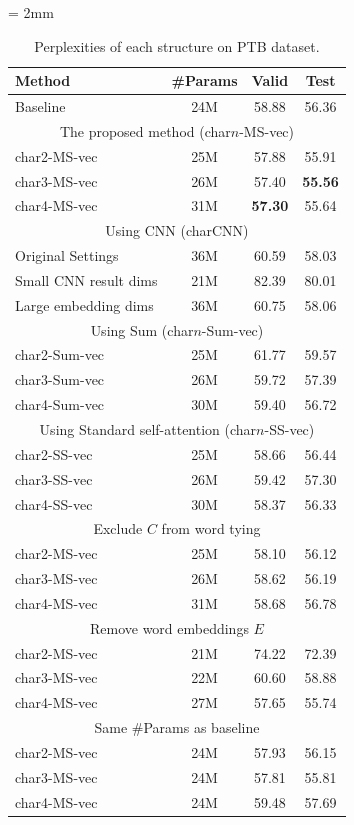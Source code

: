 \documentclass[letterpaper]{article} %
\begin{document}
\begin{table}[!t]
  \centering
  \small
  \tabcolsep = 2mm
  \begin{tabular}{ l | c | c  c  }
  \toprule
  Method & \#Params & Valid & Test \\
  \midrule
  Baseline  & 24M & 58.88 & 56.36 \\
  \midrule
  \multicolumn{4}{c}{The proposed method (char$n$-MS-vec)} \\
  \midrule
  char2-MS-vec & 25M & 57.88 & 55.91 \\
  char3-MS-vec & 26M & 57.40 & {\bf 55.56} \\
  char4-MS-vec & 31M & {\bf 57.30} & 55.64 \\
  \midrule
  \multicolumn{4}{c}{Using CNN (charCNN)} \\
  \midrule
  Original Settings & 36M & 60.59 & 58.03 \\
  Small CNN result dims & 21M & 82.39 & 80.01\\
  Large embedding dims & 36M & 60.75 & 58.06 \\
  \midrule
  \multicolumn{4}{c}{Using Sum (char$n$-Sum-vec)} \\
  \midrule
  char2-Sum-vec & 25M & 61.77 & 59.57 \\
  char3-Sum-vec & 26M & 59.72 & 57.39 \\
  char4-Sum-vec & 30M & 59.40 & 56.72 \\
  \midrule
  \multicolumn{4}{c}{Using Standard self-attention (char$n$-SS-vec)} \\
  \midrule
  char2-SS-vec & 25M & 58.66 & 56.44 \\
  char3-SS-vec & 26M & 59.42 & 57.30 \\
  char4-SS-vec & 30M & 58.37 & 56.33 \\
  \midrule
  \multicolumn{4}{c}{Exclude $C$ from word tying} \\
  \midrule
  char2-MS-vec & 25M & 58.10 & 56.12 \\
  char3-MS-vec & 26M & 58.62 & 56.19 \\
  char4-MS-vec & 31M & 58.68 & 56.78 \\
  \midrule
  \multicolumn{4}{c}{Remove word embeddings $E$} \\
  \midrule
  char2-MS-vec & 21M & 74.22 & 72.39 \\
  char3-MS-vec & 22M & 60.60 & 58.88 \\
  char4-MS-vec & 27M & 57.65 & 55.74 \\
  \midrule
  \multicolumn{4}{c}{Same \#Params as baseline} \\
  \midrule
  char2-MS-vec & 24M & 57.93 & 56.15 \\
  char3-MS-vec & 24M & 57.81 & 55.81 \\
  char4-MS-vec & 24M & 59.48 & 57.69 \\
  \bottomrule
  \end{tabular}
  \caption{Perplexities of each structure on PTB dataset.\label{tab:ablation}}
\end{table}
\end{document}

